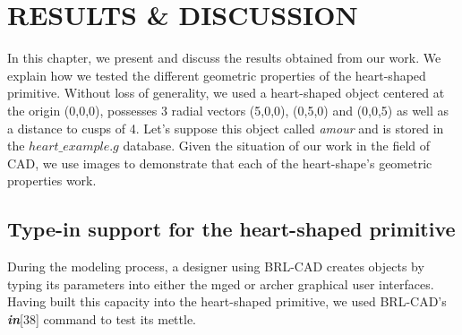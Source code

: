 
\chapter{RESULTS \& DISCUSSION} %

\label{Results \& Discussion} %



\hspace{30} In   this   chapter,   we   present   and   discuss   the   results   obtained   from   our  
work.   We   explain   how   we   tested   the   different   geometric   properties   of   the  
heart­-shaped   primitive.   Without   loss   of   generality,   we   used   a   heart-­shaped  
object   centered   at   the   origin   (0,0,0), possesses   3   radial   vectors (5,0,0), (0,5,0) 
and (0,0,5) as   well   as   a   distance   to   cusps   of   4.   Let's   suppose   this  
object   called   \emph{amour}   and   is   stored   in   the   $heart\_example.g$   database. 
Given the situation of our work in the field of CAD, we   use   images   to   demonstrate   that 
  each   of   the   heart­-shape's   geometric  properties work.  


\section{Type-in support for the heart­-shaped primitive}

\hspace{30} During   the   modeling   process,   a   designer   using   BRL­-CAD   creates objects   by   typing   
its   parameters   into   either   the   mged   or   archer   graphical   user  interfaces.   
Having   built   this   capacity   into   the   heart-­shaped   primitive,   we   used  
BRL-­CAD's \textbf{\textit{in}}[38] command to test its mettle.  

